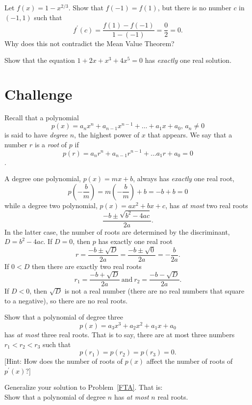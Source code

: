 \documentclass[10pt]{amsart}
\begin{document}
\begin{thm}
  Let \(f(x) = 1 - x^{2/3}\).
  Show that \(f(-1) = f(1)\), but there is no number \(c\) in \((-1,1)\) such that
  \[f^\prime(c) = \frac{f(1) - f(-1)}{1 - (-1)} = \frac{0}{2} = 0.\]
  Why does this not contradict the Mean Value Theorem?
\end{thm}

\begin{thm}
  Show that the equation \(1 + 2x + x^3 + 4x^5 = 0\) has \textit{exactly} one real solution.
\end{thm}

\section*{Challenge}

Recall that a polynomial
\[p(x) = a_n x^n + a_{n-1} x^{n-1} + \ldots + a_1 x + a_0,\, a_n \neq 0\]
is said to have \textit{degree} \(n\), the highest power of \(x\) that appears.
We say that a number \(r\) is a \textit{root} of \(p\) if
\[p(r) = a_nr^n + a_{n-1}r^{n-1} + \ldots a_1 r + a_0 = 0\].

A degree one polynomial, \(p(x) = m x + b\), always has \textit{exactly} one real root,
\[p\left(-\frac{b}{m}\right) = m\left(-\frac{b}{m}\right) + b = -b + b = 0\]
while a degree two polynomial, \(p(x) = a x^2 + b x + c\), has \textit{at most} two real roots
\[\frac{-b \pm \sqrt{b^2 - 4ac}}{2a}.\]
In the latter case, the number of roots are determined by the discriminant, \(D = b^2 - 4ac\).
If \(D = 0\), then \(p\) has exactly one real root
\[r = \frac{-b \pm \sqrt{D}}{2a} = \frac{-b \pm \sqrt{0}}{2a} = -\frac{b}{2a}.\]
If \(0 < D\) then there are exactly two real roots
\[r_1 = \frac{-b + \sqrt{D}}{2a}\ \text{and}\ r_2 = \frac{-b - \sqrt{D}}{2a}.\]
If \(D < 0\), then \(\sqrt{D}\) is not a real number (there are no real numbers that square to a negative), so there are no real roots.


\begin{thm}\label{FTA}
  Show that a polynomial of degree three
  \[p(x) = a_3x^3 + a_2x^2 + a_1x +a_0\]
  has \textit{at most} three real roots.
  That is to say, there are at most three numbers \(r_1 < r_2 < r_3\) such that
  \[p(r_1) = p(r_2) = p(r_3) = 0.\]
     {[Hint: How does the number of roots of \(p(x)\) affect the number of roots of \(p^\prime(x)\)?]}
\end{thm}

\begin{thm}
  Generalize your solution to Problem~\ref{FTA}.  That is:\vspace{\baselineskip}\\
  
  \noindent Show that a polynomial of degree \(n\) has \textit{at most} \(n\) real roots.
\end{thm}
\end{document}
